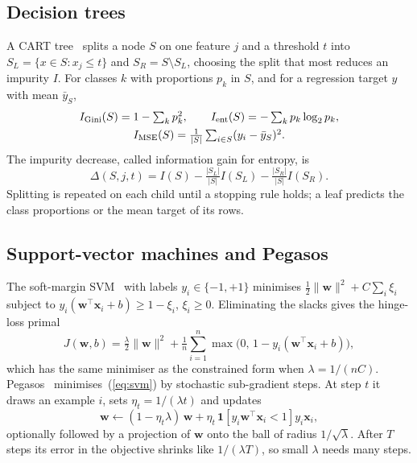 \documentclass[10pt,twocolumn,a4paper]{article}
\begin{document}
\subsection{Decision trees}
A CART tree~\cite{cart} splits a node $S$ on one feature $j$ and a
threshold $t$ into $S_L = \{x \in S : x_j \le t\}$ and
$S_R = S \setminus S_L$, choosing the split that most reduces an impurity
$I$. For classes $k$ with proportions $p_k$ in $S$, and for a regression
target $y$ with mean $\bar{y}_S$,
\begin{gather}
  I_{\text{Gini}}(S) = 1 - \textstyle\sum_k p_k^2, \qquad
  I_{\text{ent}}(S) = -\textstyle\sum_k p_k \log_2 p_k, \label{eq:imp}\\
  I_{\text{MSE}}(S) = \tfrac{1}{|S|}\textstyle\sum_{i \in S} (y_i - \bar{y}_S)^2 .\notag
\end{gather}
The impurity decrease, called information gain for entropy, is
\begin{equation}
  \Delta(S, j, t) = I(S) - \tfrac{|S_L|}{|S|} I(S_L) - \tfrac{|S_R|}{|S|} I(S_R).
  \label{eq:gain}
\end{equation}
Splitting is repeated on each child until a stopping rule holds; a leaf
predicts the class proportions or the mean target of its rows.

\subsection{Support-vector machines and Pegasos}
The soft-margin SVM~\cite{cortes} with labels $y_i \in \{-1, +1\}$
minimises $\tfrac{1}{2}\lVert\mathbf{w}\rVert^2 + C\sum_i \xi_i$ subject
to $y_i(\mathbf{w}^\top\mathbf{x}_i + b) \ge 1 - \xi_i$, $\xi_i \ge 0$.
Eliminating the slacks gives the hinge-loss primal
\begin{equation}
  J(\mathbf{w},b)=\tfrac{\lambda}{2}\lVert\mathbf{w}\rVert^{2}
  +\tfrac{1}{n}\sum_{i=1}^{n}\max\!\big(0,\,1-y_i(\mathbf{w}^{\top}\mathbf{x}_i+b)\big),
  \label{eq:svm}
\end{equation}
which has the same minimiser as the constrained form when
$\lambda = 1/(nC)$. Pegasos~\cite{pegasos} minimises~(\ref{eq:svm}) by
stochastic sub-gradient steps. At step $t$ it draws an example $i$, sets
$\eta_t = 1/(\lambda t)$ and updates
\begin{equation}
  \mathbf{w} \leftarrow (1 - \eta_t\lambda)\,\mathbf{w}
  + \eta_t\,\mathbf{1}\!\left[y_i\mathbf{w}^\top\mathbf{x}_i < 1\right] y_i\mathbf{x}_i ,
  \label{eq:pegasos}
\end{equation}
optionally followed by a projection of $\mathbf{w}$ onto the ball of
radius $1/\sqrt{\lambda}$. After $T$ steps its error in the objective
shrinks like $1/(\lambda T)$, so small $\lambda$ needs many steps.
\end{document}
